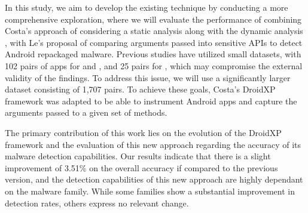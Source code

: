 In this study, we aim to develop the existing technique by conducting a more comprehensive exploration, where we will evaluate the performance of combining Costa's approach of considering a static analysis along with the dynamic analysis \cite{costa_exploring_2022}, with Le's proposal of comparing arguments passed into sensitive APIs \cite{le_towards_2018} to detect Android repackaged malware. Previous studies have utilized small datasets, with 102 pairs of apps for \cite{bao_mining_2018} and \cite{costa_exploring_2022}, and 25 pairs for \cite{le_towards_2018}, which may compromise the external validity of the findings. To address this issue, we will use a significantly larger dataset consisting of 1,707 pairs. To achieve these goals, Costa's DroidXP \cite{costa_droidxp_2020} framework was adapted to be able to instrument Android apps and capture the arguments passed to a given set of methods.

The primary contribution of this work lies on the evolution of the DroidXP framework and the evaluation of this new approach regarding the accuracy of its malware detection capabilities. Our results indicate that there is a slight improvement of 3.51\% on the overall accuracy if compared to the previous version, and the detection capabilities of this new approach are highly dependant on the malware family. While some families show a substantial improvement in detection rates, others express no relevant change.

